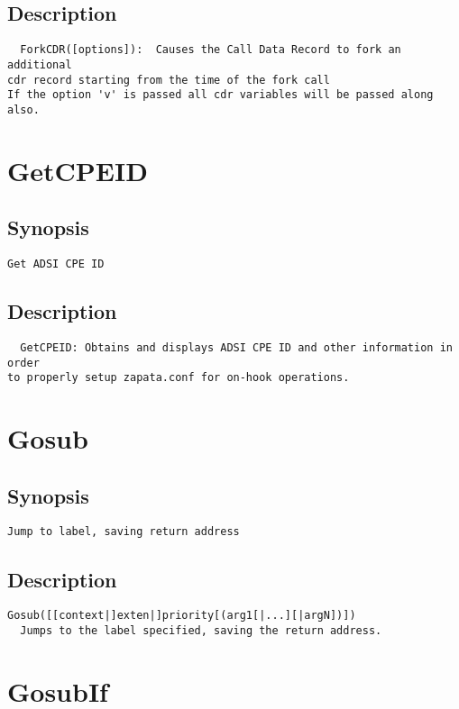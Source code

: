 \subsection{Description}
\begin{verbatim}
  ForkCDR([options]):  Causes the Call Data Record to fork an additional
cdr record starting from the time of the fork call
If the option 'v' is passed all cdr variables will be passed along also.

\end{verbatim}


\section{GetCPEID}
\subsection{Synopsis}
\begin{verbatim}
Get ADSI CPE ID
\end{verbatim}
\subsection{Description}
\begin{verbatim}
  GetCPEID: Obtains and displays ADSI CPE ID and other information in order
to properly setup zapata.conf for on-hook operations.

\end{verbatim}


\section{Gosub}
\subsection{Synopsis}
\begin{verbatim}
Jump to label, saving return address
\end{verbatim}
\subsection{Description}
\begin{verbatim}
Gosub([[context|]exten|]priority[(arg1[|...][|argN])])
  Jumps to the label specified, saving the return address.

\end{verbatim}


\section{GosubIf}
